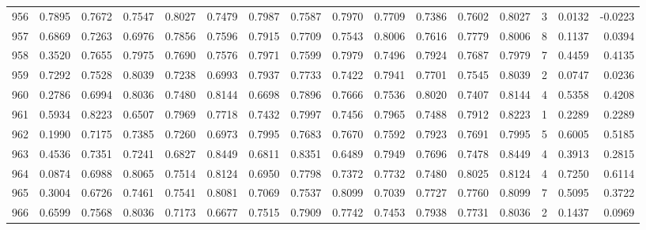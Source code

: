 \begin{tabular}{lrrrrrrrrrrrrrrr}
956 &      0.7895 &  0.7672 &  0.7547 &  0.8027 &  0.7479 &  0.7987 &  0.7587 &  0.7970 &  0.7709 &  0.7386 &   0.7602 &     0.8027 &      3 &                    0.0132 &                    -0.0223 \\
957 &      0.6869 &  0.7263 &  0.6976 &  0.7856 &  0.7596 &  0.7915 &  0.7709 &  0.7543 &  0.8006 &  0.7616 &   0.7779 &     0.8006 &      8 &                    0.1137 &                     0.0394 \\
958 &      0.3520 &  0.7655 &  0.7975 &  0.7690 &  0.7576 &  0.7971 &  0.7599 &  0.7979 &  0.7496 &  0.7924 &   0.7687 &     0.7979 &      7 &                    0.4459 &                     0.4135 \\
959 &      0.7292 &  0.7528 &  0.8039 &  0.7238 &  0.6993 &  0.7937 &  0.7733 &  0.7422 &  0.7941 &  0.7701 &   0.7545 &     0.8039 &      2 &                    0.0747 &                     0.0236 \\
960 &      0.2786 &  0.6994 &  0.8036 &  0.7480 &  0.8144 &  0.6698 &  0.7896 &  0.7666 &  0.7536 &  0.8020 &   0.7407 &     0.8144 &      4 &                    0.5358 &                     0.4208 \\
961 &      0.5934 &  0.8223 &  0.6507 &  0.7969 &  0.7718 &  0.7432 &  0.7997 &  0.7456 &  0.7965 &  0.7488 &   0.7912 &     0.8223 &      1 &                    0.2289 &                     0.2289 \\
962 &      0.1990 &  0.7175 &  0.7385 &  0.7260 &  0.6973 &  0.7995 &  0.7683 &  0.7670 &  0.7592 &  0.7923 &   0.7691 &     0.7995 &      5 &                    0.6005 &                     0.5185 \\
963 &      0.4536 &  0.7351 &  0.7241 &  0.6827 &  0.8449 &  0.6811 &  0.8351 &  0.6489 &  0.7949 &  0.7696 &   0.7478 &     0.8449 &      4 &                    0.3913 &                     0.2815 \\
964 &      0.0874 &  0.6988 &  0.8065 &  0.7514 &  0.8124 &  0.6950 &  0.7798 &  0.7372 &  0.7732 &  0.7480 &   0.8025 &     0.8124 &      4 &                    0.7250 &                     0.6114 \\
965 &      0.3004 &  0.6726 &  0.7461 &  0.7541 &  0.8081 &  0.7069 &  0.7537 &  0.8099 &  0.7039 &  0.7727 &   0.7760 &     0.8099 &      7 &                    0.5095 &                     0.3722 \\
966 &      0.6599 &  0.7568 &  0.8036 &  0.7173 &  0.6677 &  0.7515 &  0.7909 &  0.7742 &  0.7453 &  0.7938 &   0.7731 &     0.8036 &      2 &                    0.1437 &                     0.0969 \\

\end{tabular}
